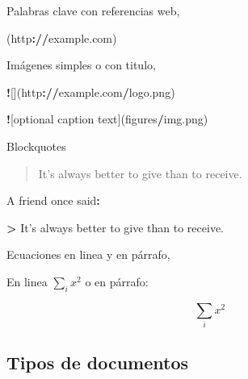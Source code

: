 \documentclass[
]{book}
\newenvironment{Shaded}{\begin{snugshade}}{\end{snugshade}}
\newcommand{\ErrorTok}[1]{\textcolor[rgb]{0.64,0.00,0.00}{\textbf{#1}}}
\newcommand{\NormalTok}[1]{#1}
\newcommand{\OperatorTok}[1]{\textcolor[rgb]{0.81,0.36,0.00}{\textbf{#1}}}
\newcommand{\StringTok}[1]{\textcolor[rgb]{0.31,0.60,0.02}{#1}}
\begin{document}
Palabras clave con referencias web,

\begin{Shaded}
\begin{Highlighting}[]
\NormalTok{[linked phrase](http}\OperatorTok{:}\ErrorTok{//}\NormalTok{example.com)}
\end{Highlighting}
\end{Shaded}

Imágenes simples o con titulo,

\begin{Shaded}
\begin{Highlighting}[]
\OperatorTok{!}\NormalTok{[](http}\OperatorTok{:}\ErrorTok{//}\NormalTok{example.com}\OperatorTok{/}\NormalTok{logo.png)}

\OperatorTok{!}\NormalTok{[optional caption text](figures}\OperatorTok{/}\NormalTok{img.png)}
\end{Highlighting}
\end{Shaded}

Blockquotes

\begin{quote}
It's always better to give than to receive.
\end{quote}

\begin{Shaded}
\begin{Highlighting}[]
\NormalTok{A friend once said}\OperatorTok{:}

\ErrorTok{>}\StringTok{ }\NormalTok{It}\StringTok{'s always better to give than to receive.}
\end{Highlighting}
\end{Shaded}

Ecuaciones en linea y en párrafo,

En linea \(\sum_i{x^2}\) o en párrafo:

\[\sum_i{x^2}\]

\begin{Shaded}
\end{Shaded}

\hypertarget{tipos-de-documentos}{%
\subsection{Tipos de documentos}\label{tipos-de-documentos}}
\end{document}
